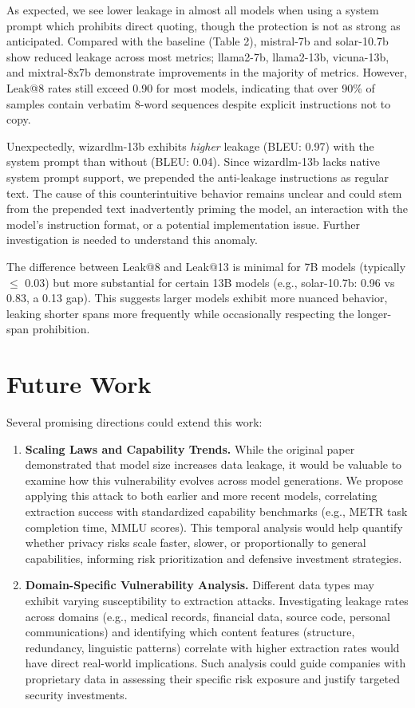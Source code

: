 \documentclass[10pt,letterpaper]{article}
\begin{document}
As expected, we see lower leakage in almost all models when using a system prompt which prohibits direct quoting, though the protection is not as strong as anticipated. Compared with the baseline (Table 2), mistral-7b and solar-10.7b show reduced leakage across most metrics; llama2-7b, llama2-13b, vicuna-13b, and mixtral-8x7b demonstrate improvements in the majority of metrics. However, Leak@8 rates still exceed 0.90 for most models, indicating that over 90\% of samples contain verbatim 8-word sequences despite explicit instructions not to copy.

Unexpectedly, wizardlm-13b exhibits \textit{higher} leakage (BLEU: 0.97) with the system prompt than without (BLEU: 0.04). Since wizardlm-13b lacks native system prompt support, we prepended the anti-leakage instructions as regular text. The cause of this counterintuitive behavior remains unclear and could stem from the prepended text inadvertently priming the model, an interaction with the model's instruction format, or a potential implementation issue. Further investigation is needed to understand this anomaly.

The difference between Leak@8 and Leak@13 is minimal for 7B models (typically $\leq$ 0.03) but more substantial for certain 13B models (e.g., solar-10.7b: 0.96 vs 0.83, a 0.13 gap). This suggests larger models exhibit more nuanced behavior, leaking shorter spans more frequently while occasionally respecting the longer-span prohibition.

\bigskip

\section{Future Work}
\noindent Several promising directions could extend this work:
\begin{enumerate}

    \item \textbf{Scaling Laws and Capability Trends.} While the original paper demonstrated that model size increases data leakage, it would be valuable to examine how this vulnerability evolves across model generations. We propose applying this attack to both earlier and more recent models, correlating extraction success with standardized capability benchmarks (e.g., METR task completion time, MMLU scores). This temporal analysis would help quantify whether privacy risks scale faster, slower, or proportionally to general capabilities, informing risk prioritization and defensive investment strategies.

    \item  \textbf{Domain-Specific Vulnerability Analysis.} Different data types may exhibit varying susceptibility to extraction attacks. Investigating leakage rates across domains (e.g., medical records, financial data, source code, personal communications) and identifying which content features (structure, redundancy, linguistic patterns) correlate with higher extraction rates would have direct real-world implications. Such analysis could guide companies with proprietary data in assessing their specific risk exposure and justify targeted security investments.
\end{enumerate}
\bigskip



\end{document}
